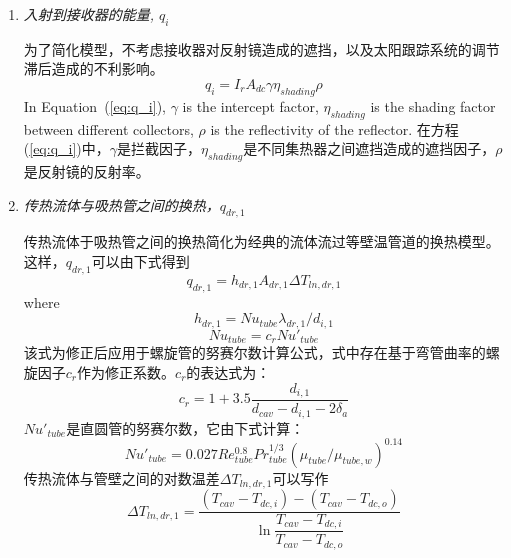 \begin{enumerate}[label=(\arabic*)]
  \item \emph{入射到接收器的能量, $q_i$}
  
  为了简化模型，不考虑接收器对反射镜造成的遮挡，以及太阳跟踪系统的调节滞后造成的不利影响。
  \begin{equation}
      q_i = I_r A_{dc} \gamma \eta_{shading} \rho
      \label{eq:q_i}
  \end{equation}
  In Equation~(\ref{eq:q_i}), $\gamma$ is the intercept factor, $\eta_{shading}$ is the shading factor between different collectors, $\rho$ is the reflectivity of the reflector.
  在方程(\ref{eq:q_i})中，$\gamma$是拦截因子，$\eta_{shading}$是不同集热器之间遮挡造成的遮挡因子，$\rho$是反射镜的反射率。
  \item \emph{传热流体与吸热管之间的换热，$q_{dr,1}$}
  
  传热流体于吸热管之间的换热简化为经典的流体流过等壁温管道的换热模型。这样，$q_{dr,1}$可以由下式得到
  \begin{equation}
      q_{dr,1} = h_{dr,1}A_{dr,1}\Delta T_{ln,dr,1}
      \label{eq:q_dr_1}
  \end{equation}
  where  
  \begin{equation}
      h_{dr,1} = Nu_{tube}\lambda_{dr,1} / d_{i,1}
\end{equation}
\begin{equation}
      Nu_{tube} = c_r Nu'_{tube}
\end{equation}
    该式为修正后应用于螺旋管的努赛尔数计算公式，式中存在基于弯管曲率的螺旋因子$c_r$作为修正系数。$c_r$的表达式为：\cite{Pablo2008}
\begin{equation}
	c_{r}=1+3.5\frac{d_{i,1}}{d_{cav}-d_{i,1}-2\delta_{a}}
\end{equation}
$Nu'_{tube}$是直圆管的努赛尔数，它由下式计算：\cite{Serth2007}
\begin{equation}
	Nu'_{tube}= 0.027Re_{tube}^{0.8}Pr_{tube}^{1/3}(\mu_{tube}/\mu_{tube,w})^{0.14}
\end{equation}
传热流体与管壁之间的对数温差$\Delta{}T_{ln,dr,1}$可以写作
\begin{equation}
	\Delta{}T_{ln,dr,1}=\frac{(T_{cav}-T_{dc,i})-(T_{cav}-T_{dc,o})}{\ln\dfrac{T_{cav}-T_{dc,i}}{T_{cav}-T_{dc,o}}}
\end{equation}


\end{enumerate}
